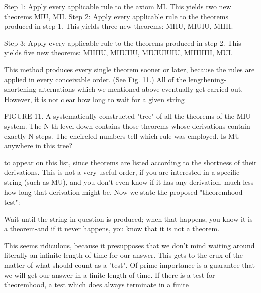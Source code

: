 Step 1: Apply every applicable rule to the axiom MI. This yields two new theorems MIU, MII. Step 2: Apply every applicable rule to the theorems produced in step 1. This yields three new theorems: MIIU, MIUIU, MIIII. 







Step 3: Apply every applicable rule to the theorems produced in step 2. This yields five new theorems: MIIIIU, MIIUIIU, MIUIUIUIU, MIIIIIIII, MUI. 



This method produces every single theorem sooner or later, because the rules are applied in every conceivable order. (See Fig. 11.) All of the lengthening-shortening alternations which we mentioned above eventually get carried out. However, it is not clear how long to wait for a given string 







FIGURE 11. A systematically constructed "tree" of all the theorems of the MIU-system. The N th level down contains those theorems whose derivations contain exactly N steps. The encircled numbers tell which rule was employed. Is MU anywhere in this tree? 



to appear on this list, since theorems are listed according to the shortness of their derivations. This is not a very useful order, if you are interested in a specific string (such as MU), and you don't even know if it has any derivation, much less how long that derivation might be. Now we state the proposed "theoremhood-test": 

Wait until the string in question is produced; when that happens, you know it is a theorem-and if it never happens, you know that it is not a theorem. 

This seems ridiculous, because it presupposes that we don't mind waiting around literally an infinite length of time for our answer. This gets to the crux of the matter of what should count as a "test". Of prime importance is a guarantee that we will get our answer in a finite length of time. If there is a test for theoremhood, a test which does always terminate in a finite 







